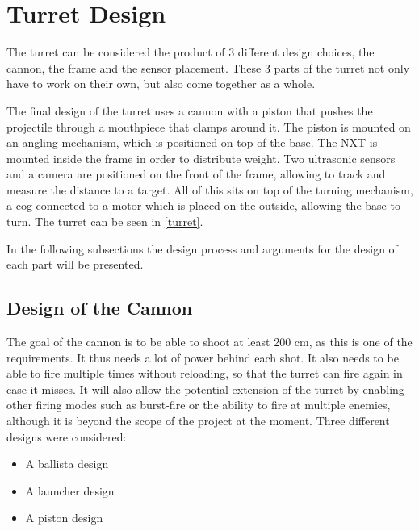 \section{Turret Design}
The turret can be considered the product of 3 different design choices, the
cannon, the frame and the sensor placement. These 3 parts of the
turret not only have to work on their own, but also come together as a whole.\nl

The final design of the turret uses a cannon with a piston
that pushes the projectile through a mouthpiece that clamps around it. The
piston is mounted on an angling mechanism, which is positioned on top of
the base. The NXT is mounted inside the frame in order to distribute weight. Two
ultrasonic sensors and a camera are positioned on the front of the frame,
allowing \name to track and measure the distance to a target. All of this sits
on top of the turning mechanism, a cog connected to a motor which is placed on the
outside, allowing the base to turn. The turret can be seen in \autoref{turret}.


In the following subsections the design process and arguments for the
design of each part will be presented.

\subsection{Design of the Cannon}
The goal of the cannon is to be able to shoot at least
200 cm, as this is one of the requirements. It thus needs a lot of power behind
each shot. It also needs to be able to fire multiple times without reloading,
so that the turret can fire again in case it misses. It will also allow the potential extension of the turret by enabling other firing modes such as burst-fire or the ability to fire at multiple enemies, although it is beyond the scope of the project at the moment. Three different designs were considered:

\begin{itemize}
  \item A ballista design
  \item A launcher design
  \item A piston design
\end{itemize}

\begin{figure}[H]
\begin{minipage}{.31\textwidth}
\end{minipage}
\begin{minipage}{.29\linewidth}
\end{minipage}
\begin{minipage}{.29\linewidth}
\end{minipage}
\end{figure}

